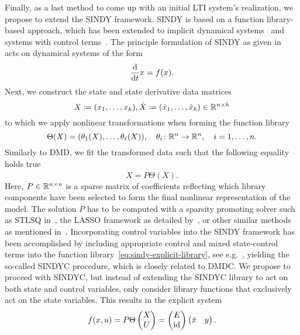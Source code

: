 Finally, as a last method to come up with an initial \ac{LTI} system's realization, we propose to extend the \ac{SINDY} framework.
\ac{SINDY} is based on a function library-based approach, which has been extended to implicit dynamical systems~\cite{Mangan2016, Kaheman2020} and systems with control terms~\cite{Kaiser2018}.
The principle formulation of \ac{SINDY} as given in~\cite{Brunton2016} acts on dynamical systems of the form
\begin{equation*}
    \frac{\mathop{}\!\mathrm{d}}{\mathop{}\!\mathrm{d} t} x = f(x).
\end{equation*}
Next, we construct the state and state derivative data matrices
\begin{equation*}
	X \coloneqq (x_1, \dots, x_k), \dot{X} \coloneqq (\dot{x}_1, \dots, \dot{x}_k) \in \mathbb{R}^{n \times k}
\end{equation*}
to which we apply nonlinear transformations when forming the function library
\begin{equation}\label{eq:sindy-explicit-library}
    \Theta(X) = (\theta_1(X), \dots, \theta_\ell(X)),\quad \theta_i \colon \mathbb{R}^n \to \mathbb{R}^n,\quad i = 1, \dots, n.
\end{equation}
Similarly to \ac{DMD}, we fit the transformed data such that the following equality holds true
\begin{equation*}
    \dot{X} = P \Theta(X).
\end{equation*}
Here, $P \in \mathbb{R}^{n \times n}$ is a sparse matrix of coefficients reflecting which library components have been selected to form the final nonlinear representation of the model.
The solution $P$ has to be computed with a sparsity promoting solver such as \ac{STLSQ} in~\cite{Zhang2019}, the LASSO framework as detailed by~\cite{Tibshirani1996}, or other similar methods as mentioned in~\cite{Kaiser2018, Kaheman2020}.
Incorporating control variables into the \ac{SINDY} framework has been accomplished by including appropriate control and mixed state-control terms into the function library~\eqref{eq:sindy-explicit-library}, see e.g.~\cite{Kaiser2018}, yielding the so-called \ac{SINDYC} procedure, which is closely related to \ac{DMDC}.
We propose to proceed with \ac{SINDYC}, but instead of extending the \ac{SINDYC} library to act on both state and control variables, only consider library functions that exclusively act on the state variables.
This results in the explicit system
\begin{equation*}
    f(x, u) = P \Theta \begin{pmatrix}
        X \\
        U
    \end{pmatrix} = \begin{pmatrix}
        E \\
        \text{id}_{}
    \end{pmatrix} \begin{pmatrix}
        \dot{x} & y
    \end{pmatrix}.
\end{equation*}
